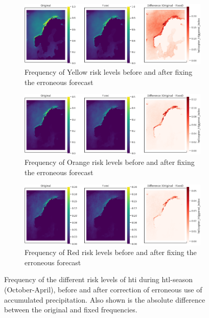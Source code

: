\begin{figure}
\centering
\begin{subfigure}{\textwidth}
    \centering
    \includegraphics[width=\textwidth]{Figures/climatologyyellow.png}
    \caption{Frequency of Yellow risk levels before and after fixing the erroneous forecast}
    \label{fig:fixred}
\end{subfigure}

\begin{subfigure}{\textwidth}
    \centering
    \includegraphics[width=\textwidth]{Figures/climatologyorange.png}
    \caption{Frequency of Orange risk levels before and after fixing the erroneous forecast}
    \label{fig:fixorange}
\end{subfigure}

\begin{subfigure}{\textwidth}
    \centering
    \includegraphics[width=\textwidth]{Figures/climatologyred.png}
    \caption{Frequency of Red risk levels before and after fixing the erroneous forecast}
    \label{fig:fixyellow}
\end{subfigure}
\caption{Frequency of the different risk levels of \acrshort{hti} during \acrshort{htl}-season (October-April), before and after correction of erroneous use of accumulated precipitation. Also shown is the absolute difference between the original and fixed frequencies.}
\label{fig:climatfix}
\end{figure}


